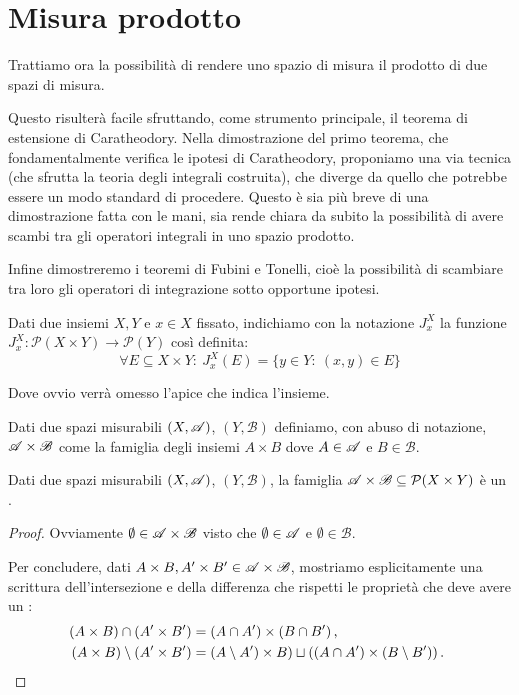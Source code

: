 \section{Misura prodotto}
Trattiamo ora la possibilità di rendere uno spazio di misura il prodotto di due spazi di misura. 

Questo risulterà facile sfruttando, come strumento principale, il teorema di estensione di Caratheodory. 
Nella dimostrazione del primo teorema, che fondamentalmente verifica le ipotesi di Caratheodory, proponiamo una via tecnica (che sfrutta la teoria degli integrali costruita), che diverge da quello che potrebbe essere un modo standard di procedere. Questo è sia più breve di una dimostrazione fatta con le mani, sia rende chiara da subito la possibilità di avere scambi tra gli operatori integrali in uno spazio prodotto. 

Infine dimostreremo i teoremi di Fubini e Tonelli, cioè la possibilità di scambiare tra loro gli operatori di integrazione sotto opportune ipotesi.


\newcommand{\B}{\ensuremath{\mathscr B}}
\begin{definition}
	Dati due insiemi $X,Y$ e $x\in X$ fissato, indichiamo con la notazione $J^X_x$ la funzione $J^X_x:\mathcal P(X\times Y) \to \mathcal P(Y)$ così definita:
	\begin{equation*}
		\forall E\subseteq X\times Y:\ J^X_x(E)=\{y\in Y:\ (x,y)\in E\}
	\end{equation*}
	
	Dove ovvio verrà omesso l'apice che indica l'insieme.
\end{definition}

\begin{definition}\label{def:SemianelloProdotto}
	Dati due spazi misurabili $(X,\mathscr A)$, $(Y,\B)$ definiamo, con abuso di notazione, $\A\times\B$ come la famiglia degli insiemi $A\times B$ dove $A\in\mathscr A$ e $B\in\B$.
\end{definition}

\begin{proposition}\label{prop:SemianelloProdotto}
	Dati due spazi misurabili $(X,\mathscr A)$, $(Y,\B)$, la famiglia $\A\times\B\subseteq \mathcal P(X\times Y)$ è un \semiring{}.
\end{proposition}
\begin{proof}
	Ovviamente $\emptyset\in\A\times\B$ visto che $\emptyset\in\mathscr A$ e $\emptyset\in\B$.
	
	Per concludere, dati $A\times B, A'\times B'\in\A\times\B$, mostriamo esplicitamente una scrittura dell'intersezione e della differenza che rispetti le proprietà che deve avere un \semiring{}:
	\begin{align*}
		(A\times B)\cap (A'\times B') &= (A\cap A')\times(B\cap B')\, \text{, } \\
		(A\times B)\setminus (A'\times B') &= (A\setminus A')\times B)\sqcup( (A\cap A')\times (B\setminus B') )\, \text{. }
	\end{align*}
\end{proof}

